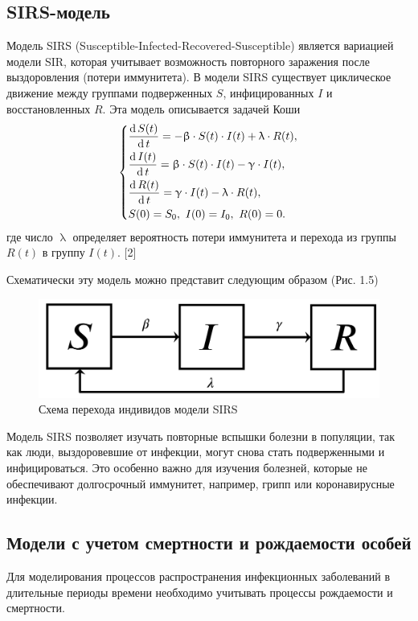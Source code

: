 \documentclass[a4paper, 14pt]{extreport}
\numberwithin{equation}{section}
\renewcommand{\beta}{\upbeta}
\renewcommand{\gamma}{\upgamma}
\renewcommand{\lambda}{\uplambda}
\renewcommand{\d}{\operatorname{d}}
\begin{document}
	\subsection{SIRS-модель}
	Модель SIRS (Susceptible-Infected-Recovered-Susceptible) является вариацией модели SIR, которая учитывает возможность повторного заражения после выздоровления (потери иммунитета). В модели SIRS существует циклическое движение между группами подверженных $S$, инфицированных $I$ и восстановленных $R$. Эта модель описывается задачей Коши
	\begin{equation}
	\begin{dcases}
		\dfrac {\d S(t)}{\d t} = -\beta \cdot S(t) \cdot I(t) + \lambda \cdot R(t),\\
		\dfrac{\d I(t)}{\d t} = \beta \cdot S(t)\cdot I(t) - \gamma\cdot I(t),\\
		\dfrac{\d R(t)}{\d t} = \gamma\cdot I(t) - \lambda \cdot R(t),\\
		S(0) = S_0,\ I(0) = I_0,\ R(0) = 0.
	\end{dcases}
	\end{equation}
	где число $\lambda$ определяет вероятность потери иммунитета и перехода из группы $R(t)$ в группу $I(t)$. [2]
	
	Схематически эту модель можно представит следующим образом (Рис. 1.5)
	\begin{figure}[h]
		\centering
		\includegraphics[scale=0.25]{images/img07}
		\caption{Схема перехода индивидов модели SIRS}
		\label{fig:img07}
	\end{figure}
	
	Модель SIRS позволяет изучать повторные вспышки болезни в популяции, так как люди, выздоровевшие от инфекции, могут снова стать подверженными и инфицироваться. Это особенно важно для изучения болезней, которые не обеспечивают долгосрочный иммунитет, например, грипп или коронавирусные инфекции.
	
	\subsection{Модели с учетом смертности и рождаемости особей}
	Для моделирования процессов распространения инфекционных заболеваний в длительные периоды времени необходимо учитывать процессы рождаемости и смертности.
	
\end{document}
